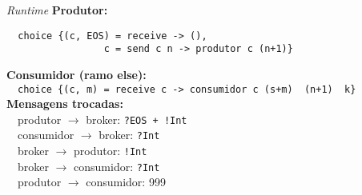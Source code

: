 \begin{frame}[fragile]{\textit{Runtime}}
  \textbf{Produtor:}\\
  \begin{lstlisting}
  choice {(c, EOS) = receive -> (),
                 c = send c n -> produtor c (n+1)}
\end{lstlisting}

\textbf{Consumidor (ramo else):}\\
$\quad$\lstinline|choice {(c, m) = receive c -> consumidor c (s+m)  (n+1)  k}|\\
\vspace{3mm}
\textbf{Mensagens trocadas:}\\
$\quad$produtor $\rightarrow$ broker: \lstinline|?EOS + !Int|\\
$\quad$consumidor $\rightarrow$ broker: \lstinline|?Int|\\
$\quad$broker $\rightarrow$ produtor: \lstinline|!Int|\\
$\quad$broker $\rightarrow$ consumidor: \lstinline|?Int|\\
$\quad$produtor $\rightarrow$ consumidor: 999

\end{frame}



